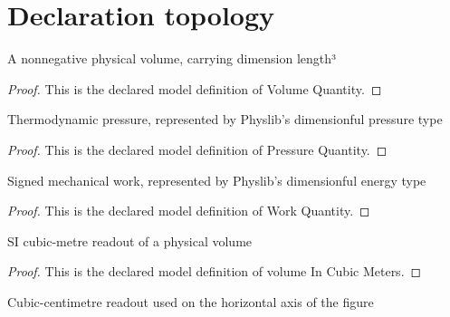 \section{Declaration topology}
\begin{definition}
  \label{def:physics:phyx-mini-0403:phyxminiproblems-problemphyxmini0403-volumequantity}
  A nonnegative physical volume, carrying dimension length³
\end{definition}
\begin{proof}
  This is the declared model definition of Volume Quantity.
\end{proof}
\begin{definition}
  \label{def:physics:phyx-mini-0403:phyxminiproblems-problemphyxmini0403-pressurequantity}
  Thermodynamic pressure, represented by Physlib's dimensionful pressure type
\end{definition}
\begin{proof}
  This is the declared model definition of Pressure Quantity.
\end{proof}
\begin{definition}
  \label{def:physics:phyx-mini-0403:phyxminiproblems-problemphyxmini0403-workquantity}
  Signed mechanical work, represented by Physlib's dimensionful energy type
\end{definition}
\begin{proof}
  This is the declared model definition of Work Quantity.
\end{proof}
\begin{definition}
  \label{def:physics:phyx-mini-0403:phyxminiproblems-problemphyxmini0403-volumeincubicmeters}
  SI cubic-metre readout of a physical volume
\end{definition}
\begin{proof}
  This is the declared model definition of volume In Cubic Meters.
\end{proof}
\begin{definition}
  \label{def:physics:phyx-mini-0403:phyxminiproblems-problemphyxmini0403-volumeincubiccentimeters}
  Cubic-centimetre readout used on the horizontal axis of the figure
\end{definition}
